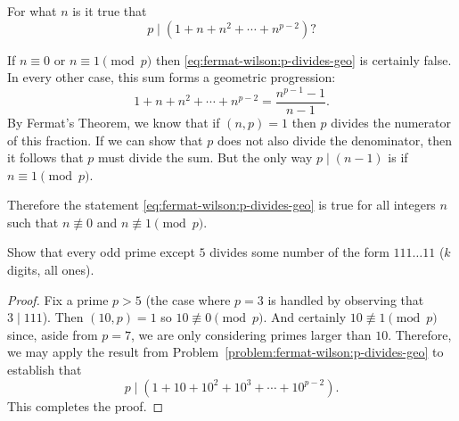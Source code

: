 \label{problem:fermat-wilson:p-divides-geo}
For what $n$ is it true that
\begin{equation}
  \label{eq:fermat-wilson:p-divides-geo}
  p\mid(1 + n + n^2 + \cdots + n^{p-2})?
\end{equation}
\begin{solution}
  If $n\equiv0$ or $n\equiv1\pmod{p}$ then
  \eqref{eq:fermat-wilson:p-divides-geo} is certainly false. In every
  other case, this sum forms a geometric progression:
  \begin{equation*}
    1 + n + n^2 + \cdots + n^{p-2} = \frac{n^{p-1} - 1}{n - 1}.
  \end{equation*}
  By Fermat's Theorem, we know that if $(n,p) = 1$ then $p$ divides
  the numerator of this fraction. If we can show that $p$ does not
  also divide the denominator, then it follows that $p$ must divide
  the sum. But the only way $p\mid(n - 1)$ is if $n\equiv1\pmod{p}$.

  Therefore the statement \eqref{eq:fermat-wilson:p-divides-geo} is
  true for all integers $n$ such that $n\not\equiv0$ and
  $n\not\equiv1\pmod{p}$.
\end{solution}

 Show that every odd prime except $5$ divides some number
of the form $111\dots11$ ($k$ digits, all ones).
\begin{proof}
  Fix a prime $p > 5$ (the case where $p = 3$ is handled by observing
  that $3\mid111$). Then $(10, p) = 1$ so $10\not\equiv0\pmod{p}$. And
  certainly $10\not\equiv1\pmod{p}$ since, aside from $p = 7$, we are
  only considering primes larger than $10$. Therefore, we may apply
  the result from Problem~\ref{problem:fermat-wilson:p-divides-geo} to
  establish that
  \begin{equation*}
    p\mid(1 + 10 + 10^2 + 10^3 + \cdots + 10^{p-2}).
  \end{equation*}
  This completes the proof.
\end{proof}
